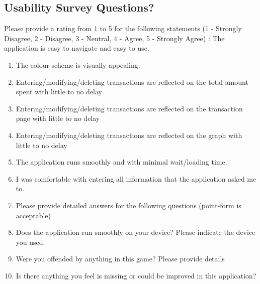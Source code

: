 \documentclass[12pt, titlepage]{article}
\begin{document}
\subsection{Usability Survey Questions?}  \label{survey:1}
Please provide a rating from 1 to 5 for the following statements (1 - Strongly Disagree, 2 - Disagree, 3 - Neutral, 4 - Agree, 5 - Strongly Agree) : 
The application is easy to navigate and easy to use.
\begin{enumerate}

\item The colour scheme is visually appealing.\label{question:q1}
\item Entering/modifying/deleting transactions are reflected on the total amount spent with little to no delay\label{question:q2}
\item Entering/modifying/deleting transactions are reflected on the transaction page with little to no delay\label{question:q3}
\item Entering/modifying/deleting transactions are reflected on the graph with little to no delay\label{question:q4}
\item The application runs smoothly and with minimal wait/loading time.\label{question:q5}
\item I was comfortable with entering all information that the application asked me to.\label{question:q6}
\item Please provide detailed answers for the following questions (point-form is acceptable)\label{question:q7}
\item Does the application run smoothly on your device? Please indicate the device you used.\label{question:q8}
\item Were you offended by anything in this game? Please provide details\label{question:q9}
\item Is there anything you feel is missing or could be improved in this application?\label{question:q10}
\end{enumerate}
\end{document}

